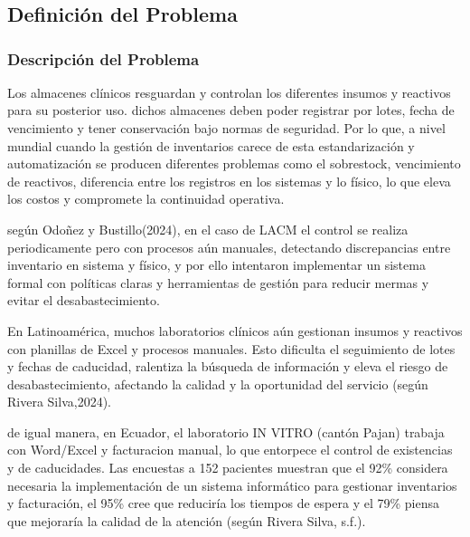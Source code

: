 \documentclass[12pt]{article} %
\begin{document}
\section*{}




\subsection{Definición del Problema}

\subsubsection{Descripción del Problema}

Los almacenes clínicos resguardan y controlan los diferentes insumos y reactivos para su posterior uso. dichos almacenes deben poder registrar por lotes, fecha de vencimiento y tener conservación bajo normas de seguridad. Por lo que, a nivel mundial cuando la gestión de inventarios carece de esta estandarización y automatización se producen diferentes problemas como el sobrestock, vencimiento de reactivos, diferencia entre los registros en los sistemas y lo físico, lo que eleva los costos y compromete la continuidad operativa.

según Odoñez y Bustillo(2024), en el caso de LACM el control se realiza periodicamente pero con procesos aún manuales, detectando discrepancias entre inventario en sistema y físico, y por ello intentaron implementar un sistema formal con políticas claras y herramientas de gestión para reducir mermas y evitar el desabastecimiento.

En Latinoamérica, muchos laboratorios clínicos aún gestionan insumos y reactivos con planillas de Excel y procesos manuales. Esto dificulta el seguimiento de lotes y fechas de caducidad, ralentiza la búsqueda de información y eleva el riesgo de desabastecimiento, afectando la calidad y la oportunidad del servicio (según Rivera Silva,2024).

de igual manera, en Ecuador, el laboratorio IN VITRO (cantón Pajan) trabaja con Word/Excel y facturacion manual, lo que entorpece el control de existencias y de caducidades. Las encuestas a 152 pacientes muestran que el 92\% considera necesaria la implementación de un sistema informático para gestionar inventarios y facturación, el 95\% cree que reduciría los tiempos de espera y el 79\% piensa que mejoraría la calidad de la atención (según Rivera Silva, s.f.).
\end{document}
